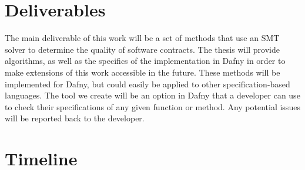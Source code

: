 \documentclass{article}
\begin{document}
\section{Deliverables}

The main deliverable of this work will be a set of methods that use an SMT solver to determine the quality of software
contracts. The thesis will provide algorithms, as well as the specifics of the implementation in Dafny in order to make
extensions of this work accessible in the future. These methods will be implemented for Dafny, but could easily be
applied to other specification-based languages. The tool we create will be an option in Dafny that a developer can
use to check their specifications of any given function or method. Any potential issues will be reported back to the
developer.

\section{Timeline}

% 
% 
% 

\end{document}
